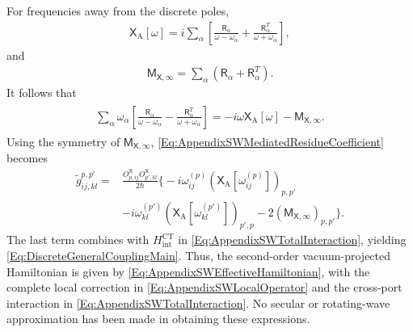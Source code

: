 \documentclass[prx,aps,twocolumn,article]{revtex4-2}
\newcommand{\msf}[1]{\mathsf{#1}}
\newcommand{\msM}{\msf{M}}
\newcommand{\msXA}{\msX_\mathrm{A}}
\newcommand{\msX}{\msf{X}}
\newcommand{\msR}{\msf{R}}
\begin{document}
For frequencies away from the discrete poles,
\begin{align}
    \msXA[\omega]
    =
    i\sum_\alpha
    \left[
        \frac{
            \msR_\alpha
        }{
            \omega-\omega_\alpha
        }
        +
        \frac{
            \msR_\alpha^T
        }{
            \omega+\omega_\alpha
        }
    \right],
\label{Eq:AppendixSWXADiscrete}
\end{align}
and
\begin{align}
    \msM_{\msX,\infty}
    =
    \sum_\alpha
    \left(
        \msR_\alpha+\msR_\alpha^T
    \right).
\label{Eq:AppendixSWAinftyResidueSum}
\end{align}
It follows that
\begin{align}
\begin{aligned}
    \sum_\alpha
    \omega_\alpha
    \left[
        \frac{
            \msR_\alpha
        }{
            \omega-\omega_\alpha
        }
        -
        \frac{
            \msR_\alpha^T
        }{
            \omega+\omega_\alpha
        }
    \right]
    =
    -i\omega\msXA[\omega]
    -
    \msM_{\msX,\infty}.
\end{aligned}
\label{Eq:AppendixSWResponseIdentity}
\end{align}
Using the symmetry of $\msM_{\msX,\infty}$,
\cref{Eq:AppendixSWMediatedResidueCoefficient} becomes
\begin{align}
\label{Eq:AppendixSWMediatedImmittanceCoefficient}
    \tilde{g}_{ij,kl}^{p,p'}
    =&
    \frac{
        O_{p,ij}^{\msX}
        O_{p',kl}^{\msX}
    }{2\hbar}
    \Bigg\{
        -i\omega_{ij}^{(p)}
        \left(
            \msXA[
                \omega_{ij}^{(p)}
            ]
        \right)_{p,p'}
        \\
        &
        -
        i\omega_{kl}^{(p')}
        \left(
            \msXA[
                \omega_{kl}^{(p')}
            ]
        \right)_{p',p}
        -
        2
        \left(
            \msM_{\msX,\infty}
        \right)_{p,p'}
    \Bigg\}.\nonumber
\end{align}
The last term combines with
$H_{\mathrm{int}}^{\mathrm{CT}}$ in \cref{Eq:AppendixSWTotalInteraction},
yielding \cref{Eq:DiscreteGeneralCouplingMain}. Thus, the second-order vacuum-projected Hamiltonian is given by \cref{Eq:AppendixSWEffectiveHamiltonian}, with the complete local correction in \cref{Eq:AppendixSWLocalOperator} and the cross-port interaction in \cref{Eq:AppendixSWTotalInteraction}. No secular or rotating-wave approximation has been made in obtaining these expressions.
\end{document}
